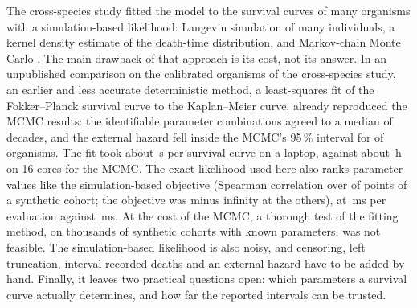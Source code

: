 The cross-species study fitted the model to the survival curves of many organisms with a simulation-based
likelihood: Langevin simulation of many individuals, a kernel density estimate of the death-time distribution, and Markov-chain Monte Carlo
\citep{raz2026damage,foremanmackey2013emcee}.
The main drawback of that approach is its cost, not its answer. In an unpublished comparison on the calibrated
organisms of the cross-species study, an earlier and less accurate deterministic method, a least-squares fit of the
Fokker--Planck survival curve to the Kaplan--Meier curve, already reproduced the MCMC results: the identifiable parameter combinations agreed to a median of  decades, and the
external hazard fell inside the MCMC's 95\,\% interval for  of  organisms. The fit took
about \,s per survival curve on a laptop, against about \,h on 16 cores for the MCMC.
The exact likelihood used here also ranks parameter values like the simulation-based objective (Spearman correlation
 over  of  points of a synthetic cohort; the objective was
minus infinity at the others), at \,ms per evaluation against \,ms. At the cost of the MCMC, a thorough test of the fitting method, on thousands of synthetic cohorts with known
parameters, was not feasible. The simulation-based likelihood is also noisy, and censoring, left truncation, interval-recorded deaths and an external
hazard have to be added by hand. Finally, it leaves two practical questions open: which parameters a survival curve
actually determines, and how far the reported intervals can be trusted.


